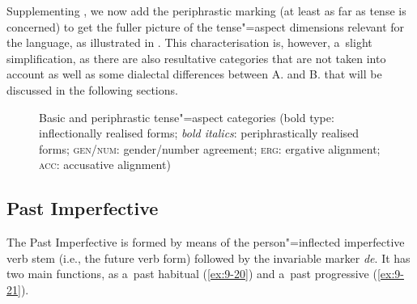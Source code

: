 Supplementing , we now add the periphrastic marking (at least as far as tense is concerned) to get the fuller picture of the tense"=aspect dimensions relevant for the language, as illustrated in . This characterisation is, however, a~slight simplification, as there are also resultative categories that are not taken into account as well as some dialectal differences between A. and B. that will be discussed in the following sections.


\begin{figure}[ht]
\centering
{}
\caption{Basic and periphrastic tense"=aspect categories (bold type: inflectionally realised forms;
  \textit{bold italics}: periphrastically realised forms; \textsc{gen/num}: gender/number agreement;
  \textsc{erg}: ergative alignment; \textsc{acc}: accusative alignment)\label{fig:9-2}}
\end{figure}

\subsection{Past Imperfective}
\label{subsec:9-1-6}

The Past Imperfective is formed by means of the person"=inflected imperfective verb stem (i.e., the future verb form) followed by the invariable marker \textit{de}. It has two main functions, as a~past habitual (\ref{ex:9-20}) and a~past progressive (\ref{ex:9-21}).

